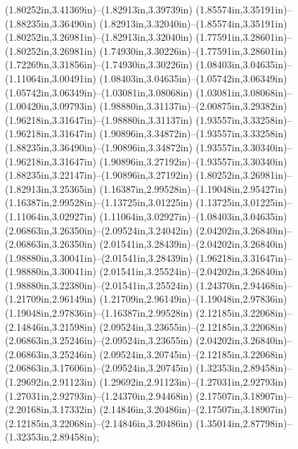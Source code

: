 (1.80252in,3.41369in)--(1.82913in,3.39739in) (1.85574in,3.35191in)--(1.88235in,3.36490in) (1.82913in,3.32040in)--(1.85574in,3.35191in) (1.80252in,3.26981in)--(1.82913in,3.32040in) (1.77591in,3.28601in)--(1.80252in,3.26981in) (1.74930in,3.30226in)--(1.77591in,3.28601in) (1.72269in,3.31856in)--(1.74930in,3.30226in) (1.08403in,3.04635in)--(1.11064in,3.00491in) (1.08403in,3.04635in)--(1.05742in,3.06349in) (1.05742in,3.06349in)--(1.03081in,3.08068in) (1.03081in,3.08068in)--(1.00420in,3.09793in) (1.98880in,3.31137in)--(2.00875in,3.29382in) (1.96218in,3.31647in)--(1.98880in,3.31137in) (1.93557in,3.33258in)--(1.96218in,3.31647in) (1.90896in,3.34872in)--(1.93557in,3.33258in) (1.88235in,3.36490in)--(1.90896in,3.34872in) (1.93557in,3.30340in)--(1.96218in,3.31647in) (1.90896in,3.27192in)--(1.93557in,3.30340in) (1.88235in,3.22147in)--(1.90896in,3.27192in) (1.80252in,3.26981in)--(1.82913in,3.25365in) (1.16387in,2.99528in)--(1.19048in,2.95427in) (1.16387in,2.99528in)--(1.13725in,3.01225in) (1.13725in,3.01225in)--(1.11064in,3.02927in) (1.11064in,3.02927in)--(1.08403in,3.04635in) (2.06863in,3.26350in)--(2.09524in,3.24042in) (2.04202in,3.26840in)--(2.06863in,3.26350in) (2.01541in,3.28439in)--(2.04202in,3.26840in) (1.98880in,3.30041in)--(2.01541in,3.28439in) (1.96218in,3.31647in)--(1.98880in,3.30041in) (2.01541in,3.25524in)--(2.04202in,3.26840in) (1.98880in,3.22380in)--(2.01541in,3.25524in) (1.24370in,2.94468in)--(1.21709in,2.96149in) (1.21709in,2.96149in)--(1.19048in,2.97836in) (1.19048in,2.97836in)--(1.16387in,2.99528in) (2.12185in,3.22068in)--(2.14846in,3.21598in) (2.09524in,3.23655in)--(2.12185in,3.22068in) (2.06863in,3.25246in)--(2.09524in,3.23655in) (2.04202in,3.26840in)--(2.06863in,3.25246in) (2.09524in,3.20745in)--(2.12185in,3.22068in) (2.06863in,3.17606in)--(2.09524in,3.20745in) (1.32353in,2.89458in)--(1.29692in,2.91123in) (1.29692in,2.91123in)--(1.27031in,2.92793in) (1.27031in,2.92793in)--(1.24370in,2.94468in) (2.17507in,3.18907in)--(2.20168in,3.17332in) (2.14846in,3.20486in)--(2.17507in,3.18907in) (2.12185in,3.22068in)--(2.14846in,3.20486in) (1.35014in,2.87798in)--(1.32353in,2.89458in);
